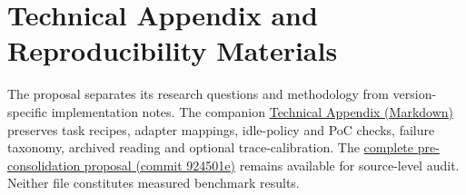 \documentclass[
  a4paper,
]{article}
\begin{document}
\clearpage
\appendix
\section{Technical Appendix and Reproducibility Materials}
\label{sec:technical-appendix}

The proposal separates its research questions and methodology
from version-specific implementation notes. The companion
\href{https://github.com/Paperpaperdog/Agent_Sandbox_Proposal/blob/main/docs/proposal-technical-appendix.md}
{Technical Appendix (Markdown)} preserves task recipes,
adapter mappings, idle-policy and PoC checks, failure
taxonomy, archived reading and optional trace-calibration.
The \href{https://github.com/Paperpaperdog/Agent_Sandbox_Proposal/blob/924501eca5448bc4dca263364cbdb7f9e6718d04/natalia.tex}
{complete pre-consolidation proposal (commit 924501e)}
remains available for source-level audit.
Neither file constitutes measured benchmark results.
\end{document}
